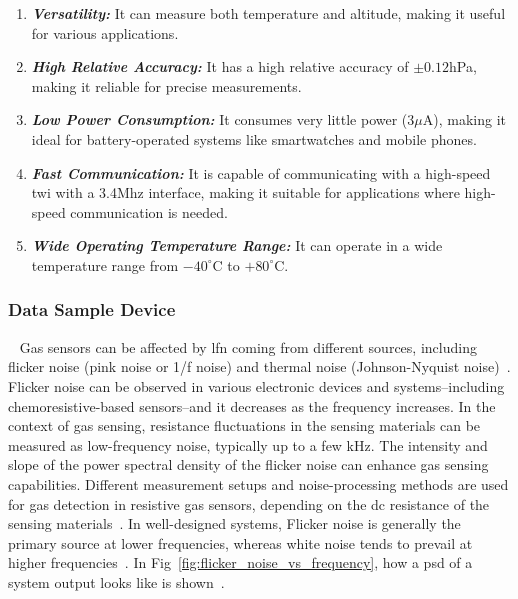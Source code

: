 \begin{itemize}
        \begin{enumerate}
            \item \textbf{\textit{Versatility:}} It can measure both temperature and altitude, making it useful for various applications.

            \item \textbf{\textit{High Relative Accuracy:}} It has a high relative accuracy of $\pm0.12$hPa, making it reliable for precise measurements.

            \item \textbf{\textit{Low Power Consumption:}} It consumes very little power ($3\mu$A), making it ideal for battery-operated systems like smartwatches and mobile phones.

            \item \textbf{\textit{Fast Communication:}} It is capable of communicating with a high-speed \acrfull{twi} with a 3.4Mhz interface, making it suitable for applications where high-speed communication is needed.

            \item \textbf{\textit{Wide Operating Temperature Range:}} It can operate in a wide temperature range from $-40^{\circ}$C to $+80^{\circ}$C.
        \end{enumerate}
\end{itemize}


\subsubsection{Data Sample Device}
~\label{sec:methodology:dev_methodology:sensors:dsd}
\hspace{8pt}
Gas sensors can be affected by \acrfull{lfn} coming from different sources, including flicker noise (pink noise or 1/f noise) and thermal noise (Johnson-Nyquist noise)~\cite{Kwon_2014, wonjun_2023,smulko_2024}. \\

Flicker noise can be observed in various electronic devices and systems--including chemoresistive-based sensors--and it decreases as the frequency increases. In the context of gas sensing, resistance fluctuations in the sensing materials can be measured as low-frequency noise, typically up to a few kHz. The intensity and slope of the power spectral density of the flicker noise can enhance gas sensing capabilities. Different measurement setups and noise-processing methods are used for gas detection in resistive gas sensors, depending on the \acrfull{dc} resistance of the sensing materials~\cite{Kwon_2014, kiely_2017}. In well-designed systems, Flicker noise is generally the primary source at lower frequencies, whereas white noise tends to prevail at higher frequencies~\cite{bahreyni_2009}. In Fig~\ref{fig:flicker_noise_vs_frequency}, how a \acrfull{psd} of a system output looks like is shown~\cite{bahreyni_2009}.

